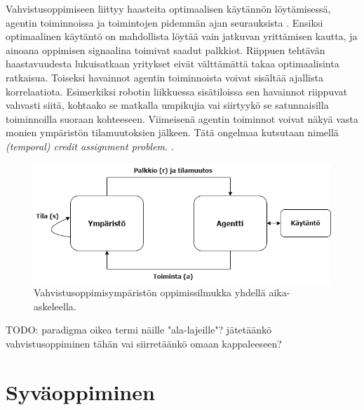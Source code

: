 \documentclass[utf8]{gradu3}
\begin{document}
Vahvistusoppimiseen liittyy haasteita optimaalisen käytännön löytämisessä, agentin toiminnoissa ja toimintojen pidemmän ajan seurauksista \parencite{arulkumaran2017brief}. Ensiksi optimaalinen käytäntö on mahdollista löytää vain jatkuvan yrittämisen kautta, ja ainoana oppimisen signaalina toimivat saadut palkkiot. Riippuen tehtävän haastavuudesta lukuisatkaan yritykset eivät välttämättä takaa optimaalisinta ratkaisua. Toiseksi havainnot agentin toiminnoista voivat sisältää ajallista korrelaatiota. Esimerkiksi robotin liikkuessa sisätiloissa sen havainnot riippuvat vahvasti siitä, kohtaako se matkalla umpikujia vai siirtyykö se satunnaisilla toiminnoilla suoraan kohteeseen. Viimeisenä agentin toiminnot voivat näkyä vasta monien ympäristön tilamuutoksien jälkeen. Tätä ongelmaa kutsutaan nimellä \textit{(temporal) credit assignment problem}. \parencite{arulkumaran2017brief}.

\begin{figure}[h]
\includegraphics[width=15cm]{reinflearning.png}
\caption{Vahvistusoppimisympäristön oppimissilmukka yhdellä aika-askeleella.}
\label{reinflearning}
\end{figure}

TODO: paradigma oikea termi näille "ala-lajeille"? jätetäänkö vahvistusoppiminen tähän vai siirretäänkö omaan kappaleeseen?

\section{Syväoppiminen}
\end{document}
